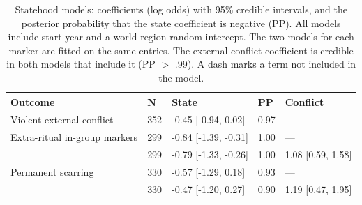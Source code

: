 \begin{table}[!ht]
\centering
\small
\caption{Statehood models: coefficients (log odds) with 95\% credible intervals, and the posterior probability that the state coefficient is negative (PP). All models include start year and a world-region random intercept. The two models for each marker are fitted on the same entries. The external conflict coefficient is credible in both models that include it (PP $>$ .99). A dash marks a term not included in the model.}
\label{tab:state_main}
\begin{tabular}{lllll}
\toprule
Outcome & N & State & PP & Conflict \\
\midrule
Violent external conflict & 352 & -0.45 [-0.94, 0.02] & 0.97 & --- \\
\midrule
Extra-ritual in-group markers & 299 & -0.84 [-1.39, -0.31] & 1.00 & --- \\
 & 299 & -0.79 [-1.33, -0.26] & 1.00 & 1.08 [0.59, 1.58] \\
\midrule
Permanent scarring & 330 & -0.57 [-1.29, 0.18] & 0.93 & --- \\
 & 330 & -0.47 [-1.20, 0.27] & 0.90 & 1.19 [0.47, 1.95] \\
\bottomrule
\end{tabular}
\end{table}